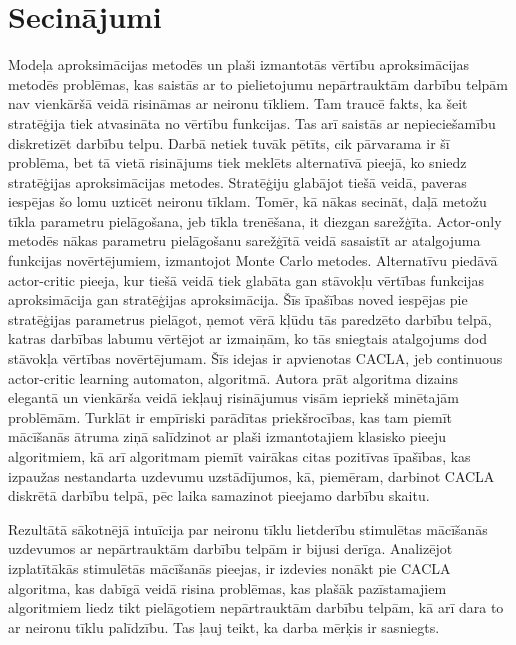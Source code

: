 \documentclass{ludis} %
\begin{document}
\chapter{Secinājumi}
Modeļa aproksimācijas metodēs un plaši izmantotās vērtību aproksimācijas metodēs problēmas, kas saistās ar to pielietojumu nepārtrauktām darbību telpām nav vienkāršā veidā risināmas ar neironu tīkliem.
Tam traucē fakts, ka šeit stratēģija tiek atvasināta no vērtību funkcijas.
Tas arī saistās ar nepieciešamību diskretizēt darbību telpu.
Darbā netiek tuvāk pētīts, cik pārvarama ir šī problēma, bet tā vietā risinājums tiek meklēts alternatīvā pieejā, ko sniedz stratēģijas aproksimācijas metodes.
Stratēģiju glabājot tiešā veidā, paveras iespējas šo lomu uzticēt neironu tīklam.
Tomēr, kā nākas secināt, daļā metožu tīkla parametru pielāgošana, jeb tīkla trenēšana, it diezgan sarežģīta.
Actor-only metodēs nākas parametru pielāgošanu sarežģītā veidā sasaistīt ar atalgojuma funkcijas novērtējumiem, izmantojot Monte Carlo metodes.
Alternatīvu piedāvā actor-critic pieeja, kur tiešā veidā tiek glabāta gan stāvokļu vērtības funkcijas aproksimācija gan stratēģijas aproksimācija.
Šīs īpašības noved iespējas pie stratēģijas parametrus pielāgot, ņemot vērā kļūdu tās paredzēto darbību telpā, katras darbības labumu vērtējot ar izmaiņām, ko tās sniegtais atalgojums dod stāvokļa vērtības novērtējumam.
Šīs idejas ir apvienotas CACLA, jeb continuous actor-critic learning automaton, algoritmā.
Autora prāt algoritma dizains elegantā un vienkārša veidā iekļauj risinājumus visām iepriekš minētajām problēmām.
Turklāt ir empīriski parādītas priekšrocības, kas tam piemīt mācīšanās ātruma ziņā salīdzinot ar plaši izmantotajiem klasisko pieeju algoritmiem, kā arī algoritmam piemīt vairākas citas pozitīvas īpašības, kas izpaužas nestandarta uzdevumu uzstādījumos, kā, piemēram, darbinot CACLA diskrētā darbību telpā, pēc laika samazinot pieejamo darbību skaitu.

Rezultātā sākotnējā intuīcija par neironu tīklu lietderību stimulētas mācīšanās uzdevumos ar nepārtrauktām darbību telpām ir bijusi derīga.
Analizējot izplatītākās stimulētās mācīšanās pieejas, ir izdevies nonākt pie CACLA algoritma, kas dabīgā veidā risina problēmas, kas plašāk pazīstamajiem algoritmiem liedz tikt pielāgotiem nepārtrauktām darbību telpām, kā arī dara to ar neironu tīklu palīdzību.
Tas ļauj teikt, ka darba mērķis ir sasniegts.


\printbibliography
\end{document}
